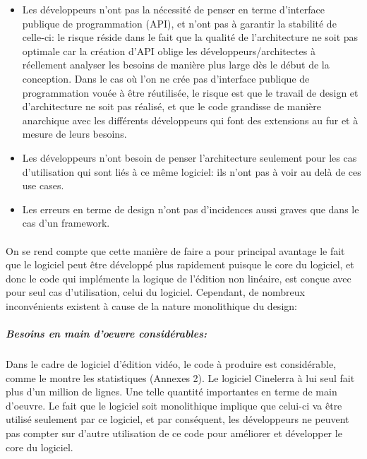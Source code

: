 \begin{itemize} \setlength{\itemsep}{2mm}

  \item {Les développeurs n'ont pas la nécessité de penser
    en terme d'interface publique de programmation (API), et
    n'ont pas à garantir la stabilité de celle-ci: le risque réside
    dans le fait que la qualité de l'architecture ne soit pas optimale
    car la création d'API oblige les développeurs/architectes
    à réellement analyser les besoins de manière plus large dès
    le début de la conception. Dans le cas où l'on ne crée pas
    d'interface publique de programmation vouée à être réutilisée,
    le risque est que le travail de design et d'architecture ne soit
    pas réalisé, et que le code grandisse de manière anarchique avec
    les différents développeurs qui font des extensions au fur et à
    mesure de leurs besoins.}

  \item {Les développeurs n'ont besoin de penser l'architecture seulement
  pour les cas d'utilisation qui sont liés à ce même logiciel:
    ils n'ont pas à voir au delà de ces use cases.}

  \item {Les erreurs en terme de design n'ont pas d'incidences aussi
    graves que dans le cas d'un framework.}
\end {itemize}

\paragraph{}

On se rend compte que cette manière de faire a pour principal avantage
le fait que le logiciel peut être développé plus rapidement puisque
le core du logiciel, et donc le code qui implémente la logique de
l'édition non linéaire, est conçue avec pour seul cas d'utilisation,
celui du logiciel. Cependant, de nombreux inconvénients existent à
cause de la nature monolithique du design:

\subparagraph{Besoins en main d'oeuvre considérables:}

\subparagraph { }

Dans le cadre de logiciel d'édition vidéo, le code à produire est
considérable, comme le montre les statistiques (Annexes 2). Le logiciel
Cinelerra à lui seul fait plus d'un million de lignes. Une telle
quantité %
importantes en terme de main d'oeuvre. Le fait que le logiciel soit
monolithique implique que celui-ci va être utilisé
seulement par ce logiciel, et par conséquent, les développeurs ne
peuvent pas compter sur d'autre utilisation de ce code pour améliorer
et développer le core du logiciel.

